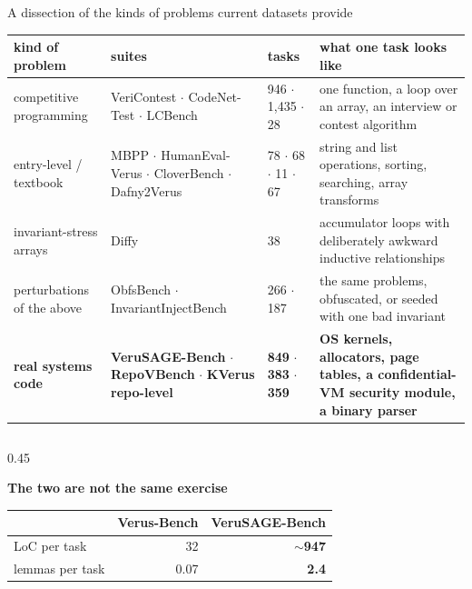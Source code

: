 \documentclass[aspectratio=169,10pt]{beamer}
\newcommand{\hd}[1]{\textbf{\color{lgTeal}#1}}
\begin{document}
\begin{frame}{A dissection of the kinds of problems current datasets provide}

\vspace{2pt}
\begin{center}
{\tiny
\renewcommand{\arraystretch}{1.15}
\setlength{\tabcolsep}{5pt}
\begin{tabular}{@{}p{27mm}p{38mm}p{16mm}p{52mm}@{}}
\toprule
\textbf{kind of problem} & \textbf{suites} & \textbf{tasks} & \textbf{what one task looks like} \\
\midrule
competitive programming
  & VeriContest $\cdot$ CodeNet-Test $\cdot$ LCBench
  & 946 $\cdot$ 1,435 $\cdot$ 28
  & one function, a loop over an array, an interview or contest algorithm \\
entry-level / textbook
  & MBPP $\cdot$ HumanEval-Verus $\cdot$ CloverBench $\cdot$ Dafny2Verus
  & 78 $\cdot$ 68 $\cdot$ 11 $\cdot$ 67
  & string and list operations, sorting, searching, array transforms \\
invariant-stress arrays
  & Diffy
  & 38
  & accumulator loops with deliberately awkward inductive relationships \\
perturbations of the above
  & ObfsBench $\cdot$ InvariantInjectBench
  & 266 $\cdot$ 187
  & the same problems, obfuscated, or seeded with one bad invariant \\
\midrule
\textbf{real systems code}
  & \textbf{VeruSAGE-Bench} $\cdot$ \textbf{RepoVBench} $\cdot$ \textbf{KVerus repo-level}
  & \textbf{849} $\cdot$ \textbf{383} $\cdot$ \textbf{359}
  & \textbf{OS kernels, allocators, page tables, a confidential-VM security module,
    a binary parser} \\
\bottomrule
\end{tabular}
}
\end{center}

\vspace{5pt}
\begin{columns}[T]
\begin{column}{0.45\textwidth}
{\scriptsize
\hd{The two are not the same exercise}\\[2pt]
\begin{tabular}{lrr}
\toprule
 & \textbf{Verus-Bench} & \textbf{VeruSAGE-Bench} \\
\midrule
LoC per task     & 32   & \textbf{$\sim$947} \\
lemmas per task  & 0.07 & \textbf{2.4} \\
\bottomrule
\end{tabular}
}
\end{column}


\end{columns}
\end{frame}
\end{document}
